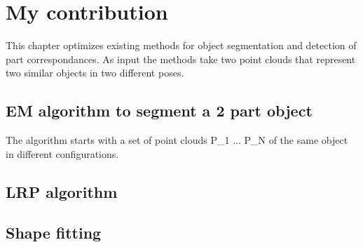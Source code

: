 \chapter{My contribution}
\label{cha:MyContribution}

This chapter optimizes existing methods for object segmentation and detection of part correspondances. As input the methods take two point clouds that represent two similar objects in two different poses.

\section{EM algorithm to segment a 2 part object}

The algorithm starts with a set of point clouds P_1 ... P_N of the same object in different configurations.


\section{LRP algorithm}




\section{Shape fitting}

